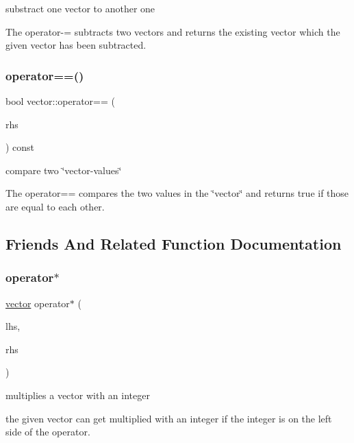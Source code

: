 substract one vector to another one 

The operator-\/= subtracts two vectors and returns the existing vector which the given vector has been subtracted. \mbox{\label{classvector_a0066b879f704f7d344ec9cd2a2f57ea3}} 
\subsubsection{\texorpdfstring{operator==()}{operator==()}}
{\footnotesize\ttfamily bool vector\+::operator== (\begin{DoxyParamCaption}\item[{const \hyperlink{classvector}{vector} \&}]{rhs }\end{DoxyParamCaption}) const}



compare two \char`\"{}vector-\/values\char`\"{} 

The operator== compares the two values in the \char`\"{}vector\char`\"{} and returns true if those are equal to each other. 

\subsection{Friends And Related Function Documentation}
\mbox{\label{classvector_aba6d5e4f302ff15758ed8ab4e6a7b681}} 
\subsubsection{\texorpdfstring{operator$\ast$}{operator*}}
{\footnotesize\ttfamily \hyperlink{classvector}{vector} operator$\ast$ (\begin{DoxyParamCaption}\item[{const int}]{lhs,  }\item[{\hyperlink{classvector}{vector} \&}]{rhs }\end{DoxyParamCaption})\hspace{0.3cm}{\ttfamily [friend]}}



multiplies a vector with an integer 

the given vector can get multiplied with an integer if the integer is on the left side of the operator. \mbox{\label{classvector_a7a6813f75dabd6f9575f9d6f91890255}} 
